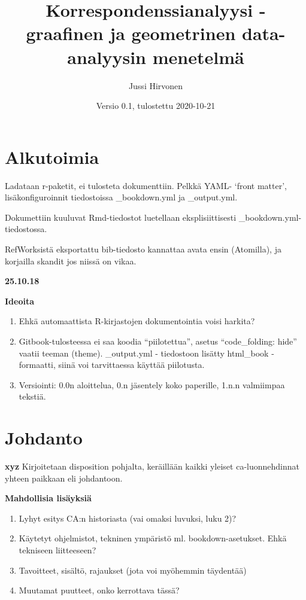 \documentclass[
  finnish,
]{book}
\title{Korrespondenssianalyysi - graafinen ja geometrinen data-analyysin menetelmä}
\author{Jussi Hirvonen}
\date{Versio 0.1, tulostettu 2020-10-21}
\begin{document}
\maketitle

{
\setcounter{tocdepth}{2}
\tableofcontents
}
\hypertarget{alkutoimia}{%
\chapter*{Alkutoimia}\label{alkutoimia}}

Ladataan r-paketit, ei tulosteta dokumenttiin. Pelkkä YAML- `front matter',
lisäkonfiguroinnit tiedostoissa \_bookdown.yml ja \_output.yml.

Dokumettiin kuuluvat Rmd-tiedostot luetellaan eksplisiittisesti
\_bookdown.yml-tiedostossa.

RefWorksistä eksportattu bib-tiedosto kannattaa avata ensin (Atomilla),
ja korjailla skandit jos niissä on vikaa.

\textbf{25.10.18}

\textbf{Ideoita}

\begin{enumerate}
\def\labelenumi{\arabic{enumi}.}
\item
  Ehkä automaattista R-kirjastojen dokumentointia voisi harkita?
\item
  Gitbook-tulosteessa ei saa koodia ``piilotettua'', asetus ``code\_folding: hide'' vaatii teeman (theme). \_output.yml - tiedostoon lisätty html\_book - formaatti, siinä voi tarvittaessa käyttää piilotusta.
\item
  Versiointi: 0.0n aloittelua, 0.n jäsentely koko paperille, 1.n.n valmiimpaa tekstiä.
\end{enumerate}

\hypertarget{johdanto}{%
\chapter{Johdanto}\label{johdanto}}

\textbf{xyz} Kirjoitetaan disposition pohjalta, keräillään kaikki yleiset
ca-luonnehdinnat yhteen paikkaan eli johdantoon.

\textbf{Mahdollisia lisäyksiä}

\begin{enumerate}
\def\labelenumi{\arabic{enumi}.}
\item
  Lyhyt esitys CA:n historiasta (vai omaksi luvuksi, luku 2)?
\item
  Käytetyt ohjelmistot, tekninen ympäristö ml. bookdown-asetukset.
  Ehkä tekniseen liitteeseen?
\item
  Tavoitteet, sisältö, rajaukset (jota voi myöhemmin täydentää)
\item
  Muutamat puutteet, onko kerrottava tässä?
\end{enumerate}
\end{document}

